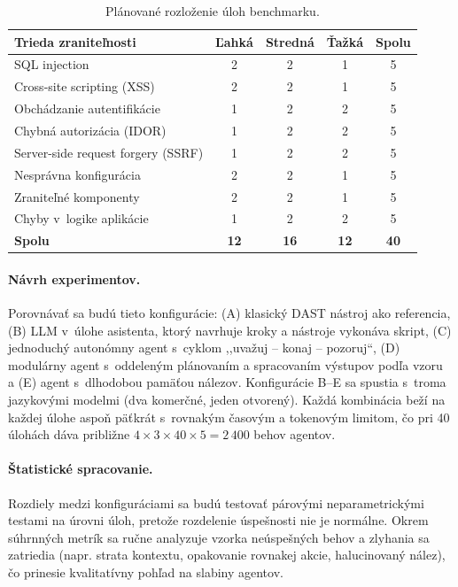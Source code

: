 \documentclass[11pt,a4paper]{article}
\begin{document}
\begin{table}[htbp]
\centering
\caption{Plánované rozloženie úloh benchmarku.}
\label{tab:benchmark}
\begin{tabular}{@{}lcccc@{}}
\toprule
\textbf{Trieda zraniteľnosti} & \textbf{Ľahká} & \textbf{Stredná} & \textbf{Ťažká} & \textbf{Spolu} \\ \midrule
SQL injection & 2 & 2 & 1 & 5 \\
Cross-site scripting (XSS) & 2 & 2 & 1 & 5 \\
Obchádzanie autentifikácie & 1 & 2 & 2 & 5 \\
Chybná autorizácia (IDOR) & 1 & 2 & 2 & 5 \\
Server-side request forgery (SSRF) & 1 & 2 & 2 & 5 \\
Nesprávna konfigurácia & 2 & 2 & 1 & 5 \\
Zraniteľné komponenty & 2 & 2 & 1 & 5 \\
Chyby v~logike aplikácie & 1 & 2 & 2 & 5 \\ \midrule
\textbf{Spolu} & \textbf{12} & \textbf{16} & \textbf{12} & \textbf{40} \\ \bottomrule
\end{tabular}
\end{table}

\paragraph{Návrh experimentov.} Porovnávať sa budú tieto konfigurácie: (A) klasický DAST nástroj ako referencia, (B) LLM v~úlohe asistenta, ktorý navrhuje kroky a nástroje vykonáva skript, (C) jednoduchý autonómny agent s~cyklom ,,uvažuj -- konaj -- pozoruj``, (D) modulárny agent s~oddeleným plánovaním a spracovaním výstupov podľa vzoru~\cite{Deng-PentestGPT} a (E) agent s~dlhodobou pamäťou nálezov. Konfigurácie B--E sa spustia s~troma jazykovými modelmi (dva komerčné, jeden otvorený). Každá kombinácia beží na každej úlohe aspoň päťkrát s~rovnakým časovým a tokenovým limitom, čo pri 40 úlohách dáva približne $4 \times 3 \times 40 \times 5 = 2\,400$ behov agentov.

\paragraph{Štatistické spracovanie.} Rozdiely medzi konfiguráciami sa budú testovať párovými neparametrickými testami na úrovni úloh, pretože rozdelenie úspešnosti nie je normálne. Okrem súhrnných metrík sa ručne analyzuje vzorka neúspešných behov a zlyhania sa zatriedia (napr. strata kontextu, opakovanie rovnakej akcie, halucinovaný nález), čo prinesie kvalitatívny pohľad na slabiny agentov.
\end{document}
